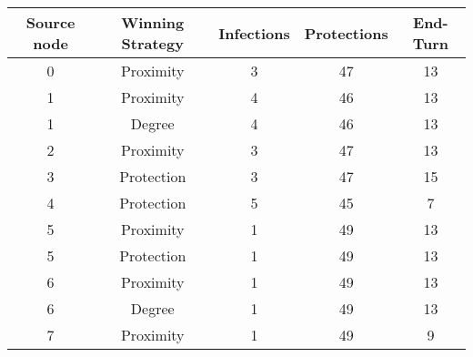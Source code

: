 \documentclass[results.tex]{subfiles}
\begin{document}
    \begin{center}
        \begin{tabular}{| c || c | c | c | c |}
            \hline
            {\bfseries Source node} & {\bfseries Winning Strategy} & {\bfseries Infections} & {\bfseries Protections}
            & {\bfseries End-Turn}
            \\  %
            \hline\hline
            0                       & Proximity                    & 3                      & 47                      & 13                   \\
            \hline
            1                       & Proximity                    & 4                      & 46                      & 13                   \\
            \hline
            1                       & Degree                       & 4                      & 46                      & 13                   \\
            \hline
            2                       & Proximity                    & 3                      & 47                      & 13                   \\
            \hline
            3                       & Protection                   & 3                      & 47                      & 15                   \\
            \hline
            4                       & Protection                   & 5                      & 45                      & 7                    \\
            \hline
            5                       & Proximity                    & 1                      & 49                      & 13                   \\
            \hline
            5                       & Protection                   & 1                      & 49                      & 13                   \\
            \hline
            6                       & Proximity                    & 1                      & 49                      & 13                   \\
            \hline
            6                       & Degree                       & 1                      & 49                      & 13                   \\
            \hline
            7                       & Proximity                    & 1                      & 49                      & 9                    \\

\end{tabular}
\end{center}
\end{document}
